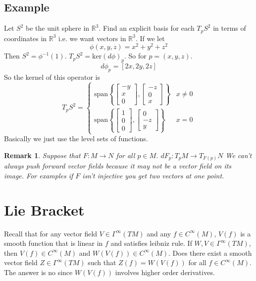 \documentclass[a4paper]{article}
\newtheorem*{rem}{Remark}
\begin{document}
\subsection*{Example}%
Let $S^2$ be the unit sphere in $\mathds{R}^3$. Find an explicit basis for each $T_pS^2$ in terms of coordinates in $\mathds{R}^3$ i.e. we want vectors in $\mathds{R}^3$. If we let 
\[
  \phi(x,y,z) = x^2 + y^2 + z^2
\]
Then $S^2 = \phi^{-1}(1)$. $T_pS^2 = \text{ker}(d\phi)_p$. So for $p = (x,y,z)$.
\[
  d\phi_p = [2x, 2y, 2z]
\]
So the kernel of this operator is 
\[
  T_pS^2 = 
  \begin{cases}
  \text{span} \left\{ 
  \begin{bmatrix}
    -y \\
    x \\
    0
  \end{bmatrix},
\begin{bmatrix}
  -z\\
  0 \\
  x
\end{bmatrix}\right\}
& x \neq 0 \\
  \text{span} \left\{ 
  \begin{bmatrix}
    1 \\
    0 \\
    0
  \end{bmatrix},
\begin{bmatrix}
  0\\
  -z \\
  y
\end{bmatrix}\right\} & x = 0

  \end{cases}
\] 
Basically we just use the level sets of functions.
\begin{rem}
Suppose that $F: M \rightarrow N$ for all $p \in M$. $dF_p: T_pM \rightarrow T_{F(p)}N$
We can't always push forward vector fields because it may not be a vector field on its image. For examples if $F$ isn't injective you get two vectors at one point.
\end{rem}
\section*{Lie Bracket}%
Recall that for any vector field $V \in \Gamma^{\infty}(TM)$ and any $f \in C^{\infty}(M)$, $V(f)$ is a smooth function that is linear in $f$ and satisfies leibniz rule. If $W,V \in \Gamma^{\infty}(TM)$, then $V(f) \in C^{\infty}(M)$ and $W(V(f)) \in C^{\infty}(M)$. Does there exist a smooth vector field $Z \in \Gamma^{\infty}(TM)$ such that $Z(f) = W(V(f))$ for all $f \in C^{\infty}(M)$. The answer is no since $W(V(f))$ involves higher order derivatives.
\end{document}
